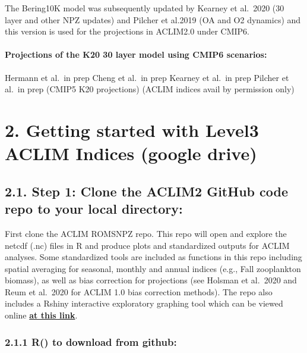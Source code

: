 \documentclass[
]{article}
\begin{document}
The Bering10K model was subsequently updated by Kearney et al.~2020 (30
layer and other NPZ updates) and Pilcher et al.2019 (OA and O2 dynamics)
and this version is used for the projections in ACLIM2.0 under CMIP6.

\hypertarget{projections-of-the-k20-30-layer-model-using-cmip6-scenarios}{%
\paragraph{Projections of the K20 30 layer model using CMIP6
scenarios:}\label{projections-of-the-k20-30-layer-model-using-cmip6-scenarios}}

Hermann et al.~in prep Cheng et al.~in prep Kearney et al.~in prep
Pilcher et al.~in prep (CMIP5 K20 projections) (ACLIM indices avail by
permission only)

\hypertarget{getting-started-with-level3-aclim-indices-google-drive}{%
\section{2. Getting started with Level3 ACLIM Indices (google
drive)}\label{getting-started-with-level3-aclim-indices-google-drive}}

\hypertarget{step-1-clone-the-aclim2-github-code-repo-to-your-local-directory}{%
\subsection{2.1. Step 1: Clone the ACLIM2 GitHub code repo to your local
directory:}\label{step-1-clone-the-aclim2-github-code-repo-to-your-local-directory}}

First clone the ACLIM ROMSNPZ repo. This repo will open and explore the
netcdf (.nc) files in R and produce plots and standardized outputs for
ACLIM analyses. Some standardized tools are included as functions in
this repo including spatial averaging for seasonal, monthly and annual
indices (e.g., Fall zooplankton biomass), as well as bias correction for
projections (see Holsman et al.~2020 and Reum et al.~2020 for ACLIM 1.0
bias correction methods). The repo also includes a Rshiny interactive
exploratory graphing tool which can be viewed online \href{}{\textbf{at
this link}}.

\hypertarget{r-to-download-from-github}{%
\subsubsection{2.1.1 R() to download from
github:}\label{r-to-download-from-github}}
\end{document}
